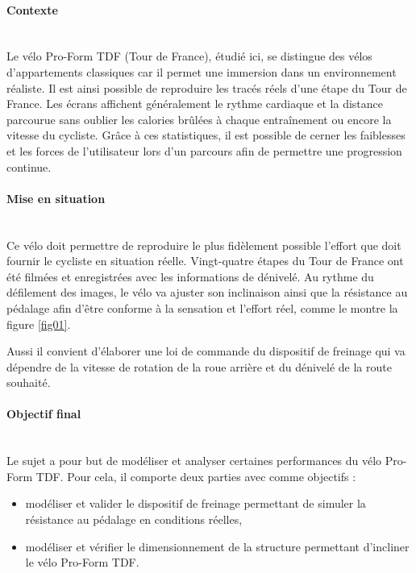 

\paragraph{Contexte} ~\ \\

Le vélo Pro-Form TDF (Tour de France), étudié ici, se distingue des vélos d'appartements classiques car il permet une immersion dans un environnement réaliste. Il est ainsi possible de reproduire les tracés réels d'une étape du Tour de France. Les écrans affichent généralement le rythme cardiaque et la distance parcourue sans oublier les calories brûlées à chaque entraînement ou encore la vitesse du cycliste. Grâce à ces statistiques, il est possible de cerner les faiblesses et les forces de l'utilisateur lors d'un parcours afin de permettre une progression continue.


\paragraph{Mise en situation} ~\ \\

Ce vélo doit permettre de reproduire le plus fidèlement possible l'effort que doit fournir le cycliste en situation réelle. Vingt-quatre étapes du Tour de France ont été filmées et enregistrées avec les informations de dénivelé.
Au rythme du défilement des images, le vélo va ajuster son inclinaison ainsi que la résistance au pédalage afin d'être conforme à la sensation et l'effort réel, comme le montre la figure \ref{fig01}.

Aussi il convient d'élaborer une loi de commande du dispositif de freinage qui va dépendre de la vitesse de rotation de la roue arrière et du dénivelé de la route souhaité.

\paragraph{Objectif final} ~\ \\

Le sujet a pour but de modéliser et analyser certaines performances du vélo Pro-Form TDF. Pour cela, il comporte deux parties avec comme objectifs :
\begin{itemize}
 \item modéliser et valider le dispositif de freinage permettant de simuler la résistance au pédalage en conditions réelles,
 \item modéliser et vérifier le dimensionnement de la structure permettant d'incliner le vélo Pro-Form TDF.
\end{itemize}

